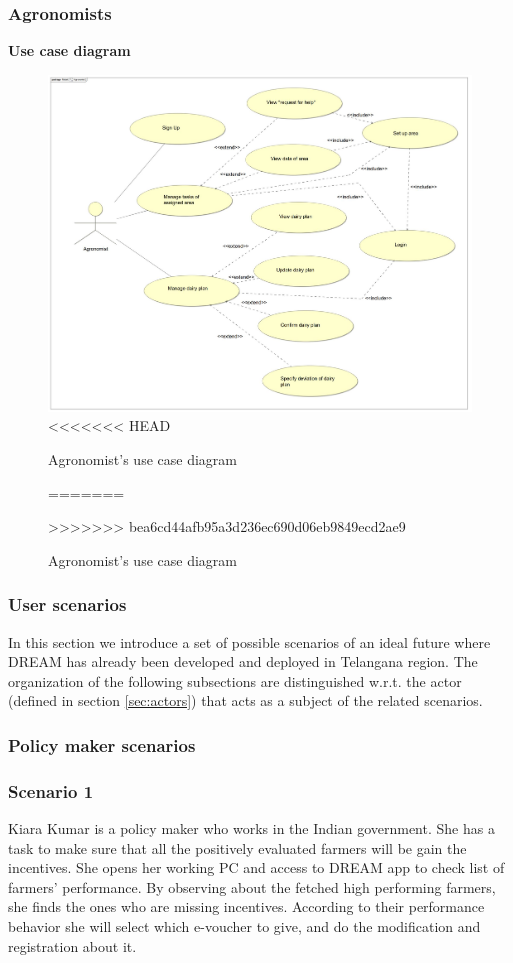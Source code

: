 \subsubsection{Agronomists}
\textbf{\textcolor{myblue}{Use case diagram}}
\begin{figure}[H]
	\centering
    \includegraphics[page=1, width=\textwidth]{Images/ud_ag.JPG}
<<<<<<< HEAD
	\caption{\label{fig:a_use_case_diagram}Agronomist's use case diagram}
=======
	\caption{\label{fig:use_case_diagram}Agronomist's use case diagram}
>>>>>>> bea6cd44afb95a3d236ec690d06eb9849ecd2ae9
\end{figure}
\label{sect:agronomist_requirements}


\subsubsection{User scenarios}
In this section we introduce a set of possible scenarios of an ideal future where DREAM has already been developed and deployed in Telangana region. The organization of the following subsections are distinguished w.r.t. the actor (defined in section \ref{sec:actors}) that acts as a subject of the related scenarios.
\subsubsection{Policy maker scenarios}

\subsubsection*{Scenario 1}
Kiara Kumar is a policy maker who works in the Indian government. She has a task to make sure that all the positively evaluated farmers will be gain the incentives. She opens her working PC and access to DREAM app to check list of farmers' performance. By observing about the fetched high performing farmers, she finds the ones who are missing incentives. According to their performance behavior she will select which e-voucher to give, and do the modification and registration about it.
